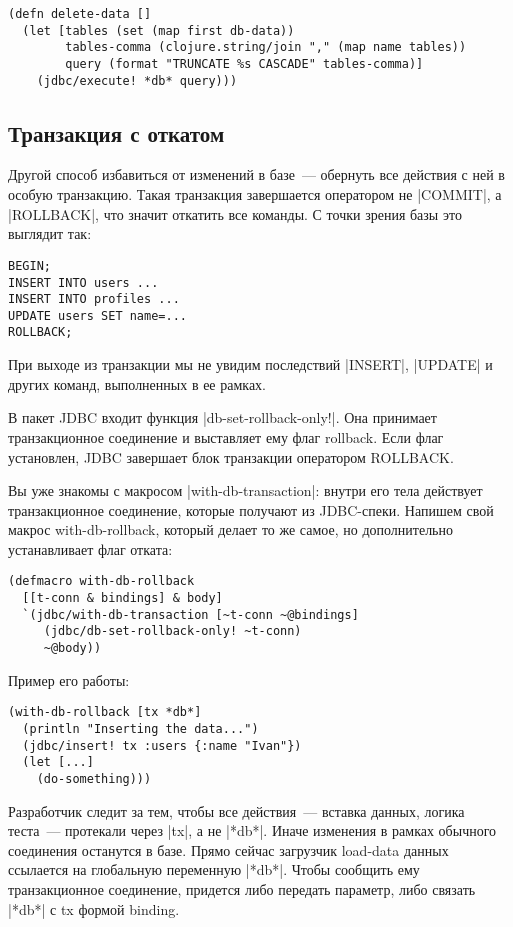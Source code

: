 \begin{verbatim}
(defn delete-data []
  (let [tables (set (map first db-data))
        tables-comma (clojure.string/join "," (map name tables))
        query (format "TRUNCATE %s CASCADE" tables-comma)]
    (jdbc/execute! *db* query)))
\end{verbatim}

\subsection{Транзакция с откатом}

Другой способ избавиться от изменений в базе~--- обернуть все действия с ней в
особую транзакцию. Такая транзакция завершается оператором не \spverb|COMMIT|, а
\spverb|ROLLBACK|, что значит откатить все команды. С точки зрения базы это выглядит
так:

\begin{verbatim}
BEGIN;
INSERT INTO users ...
INSERT INTO profiles ...
UPDATE users SET name=...
ROLLBACK;
\end{verbatim}

При выходе из транзакции мы не увидим последствий \spverb|INSERT|, \spverb|UPDATE| и других
команд, выполненных в ее рамках.

В пакет JDBC входит функция \spverb|db-set-rollback-only!|. Она принимает
транзакционное соединение и выставляет ему флаг rollback. Если флаг установлен,
JDBC завершает блок транзакции оператором ROLLBACK.

Вы уже знакомы с макросом \spverb|with-db-transaction|: внутри его тела действует
транзакционное соединение, которые получают из JDBC-спеки. Напишем свой макрос
with-db-rollback, который делает то же самое, но дополнительно устанавливает
флаг отката:

\begin{verbatim}
(defmacro with-db-rollback
  [[t-conn & bindings] & body]
  `(jdbc/with-db-transaction [~t-conn ~@bindings]
     (jdbc/db-set-rollback-only! ~t-conn)
     ~@body))
\end{verbatim}

Пример его работы:

\begin{verbatim}
(with-db-rollback [tx *db*]
  (println "Inserting the data...")
  (jdbc/insert! tx :users {:name "Ivan"})
  (let [...]
    (do-something)))
\end{verbatim}

Разработчик следит за тем, чтобы все действия~--- вставка данных, логика теста~---
протекали через \spverb|tx|, а не \spverb|*db*|. Иначе изменения в рамках обычного соединения
останутся в базе. Прямо сейчас загрузчик load-data данных ссылается на
глобальную переменную \spverb|*db*|. Чтобы сообщить ему транзакционное соединение,
придется либо передать параметр, либо связать \spverb|*db*| с tx формой binding.

